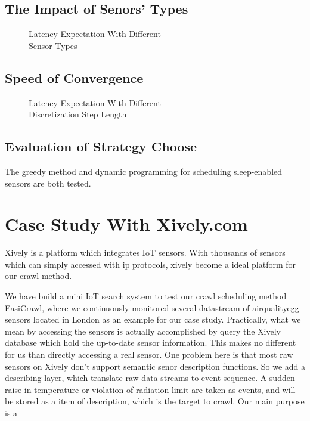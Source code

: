 \documentclass[conference]{IEEEtran}
\begin{document}
\subsection{The Impact of Senors' Types}

\begin{figure}
	\centering
	
	\captionsetup{justification=centering}
	\caption{Latency Expectation With Different 
		\\Sensor Types}
	\label{fig:test5_sensortype}
\end{figure}

\subsection{Speed of Convergence}

\begin{figure}
	\centering
	
	\captionsetup{justification=centering}
	\caption{Latency Expectation With Different 
		\\Discretization Step Length}
	\label{fig:test6_convergespeed}
\end{figure}


\subsection{Evaluation of Strategy Choose}

The greedy method and dynamic programming for scheduling sleep-enabled sensors are both tested.

\section{Case Study With Xively.com}

Xively is a platform which integrates IoT sensors. With thousands of sensors which can simply accessed with ip protocols, xively become a ideal platform for our crawl method.


We have build a mini IoT search system to test our crawl scheduling method EasiCrawl, where we continuously monitored several datastream of airqualityegg\cite{airegg} sensors located in London as an example for our case study. 
Practically, what we mean by accessing the sensors is actually accomplished by query the Xively database which hold the up-to-date sensor information. This makes no different for us than directly accessing a real sensor. One problem here is that most raw sensors on Xively don't support semantic senor description functions. So we add a describing layer, which translate raw data streams to event sequence. A sudden raise in temperature or violation of radiation limit are taken as events, and will be stored as a item of description, which is the target to crawl.
Our main purpose is a
\end{document}
